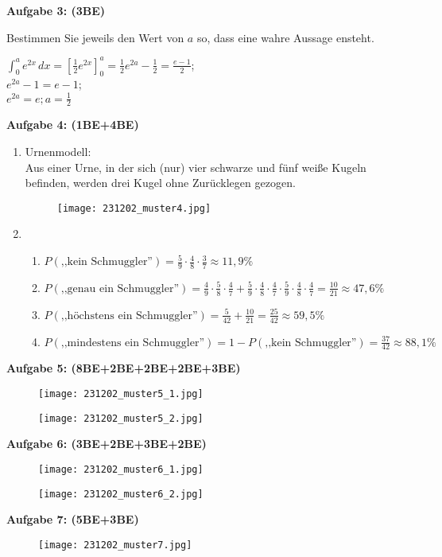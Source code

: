 \documentclass[a4paper,12pt]{article}
\newcommand{\Aufgabe}[1]{
  {
  \vspace*{0.5cm}
  \textsf{\textbf{Aufgabe #1}}
  \vspace*{0.2cm}
  
  }
}
\begin{document}
\Aufgabe{3: (3BE)}
Bestimmen Sie jeweils den Wert von $a$ so, dass eine wahre Aussage ensteht.

$\int_0^a e^{2x}\, dx=[\frac{1}{2}e^{2x}]_0^a=\frac{1}{2}e^{2a}-\frac{1}{2}=\frac{e-1}{2}$;\\
$e^{2a}-1=e-1$;\\
$e^{2a}=e; a=\frac{1}{2}$

\newpage
\Aufgabe{4: (1BE+4BE)}
\begin{enumerate}[label={\alph*)}]
  \item Urnenmodell:\\
    Aus einer Urne, in der sich (nur) vier schwarze und fünf weiße Kugeln befinden, werden drei Kugel ohne Zurücklegen gezogen.
  \begin{figure}[H]
    \vspace{0cm}
    \centering
    \texttt{[image: 231202\_muster4.jpg]}
  \end{figure}
  \item
      \begin{enumerate}[label={(\arabic*)}]
        \item $P(\text{,,kein Schmuggler''})=\frac{5}{9}\cdot\frac{4}{8}\cdot\frac{3}{7}\approx 11,9\%$
        \item $P(\text{,,genau ein Schmuggler''})=\frac{4}{9}\cdot\frac{5}{8}\cdot\frac{4}{7}+\frac{5}{9}\cdot\frac{4}{8}\cdot\frac{4}{7}\cdot\frac{5}{9}\cdot\frac{4}{8}\cdot\frac{4}{7}=\frac{10}{21}\approx 47,6\%$
        \item $P(\text{,,höchstens ein Schmuggler''})=\frac{5}{42}+\frac{10}{21}=\frac{25}{42}\approx 59,5\%$
        \item $P(\text{,,mindestens ein Schmuggler''})=1-P(\text{,,kein Schmuggler''})=\frac{37}{42}\approx 88,1\%$
      \end{enumerate}
\end{enumerate}

\Aufgabe{5: (8BE+2BE+2BE+2BE+3BE)}
  \begin{figure}[H]
    \vspace{0cm}
    \centering
    \texttt{[image: 231202\_muster5\_1.jpg]}
  \end{figure}
  \begin{figure}[H]
    \vspace{0cm}
    \centering
    \texttt{[image: 231202\_muster5\_2.jpg]}
  \end{figure}

\Aufgabe{6: (3BE+2BE+3BE+2BE)}
  \begin{figure}[H]
    \vspace{0cm}
    \centering
    \texttt{[image: 231202\_muster6\_1.jpg]}
  \end{figure}
  \begin{figure}[H]
    \vspace{0cm}
    \centering
    \texttt{[image: 231202\_muster6\_2.jpg]}
  \end{figure}

\Aufgabe{7: (5BE+3BE)}
  \begin{figure}[H]
    \vspace{0cm}
    \centering
    \texttt{[image: 231202\_muster7.jpg]}
  \end{figure}
\end{document}
